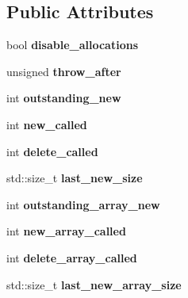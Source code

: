 \subsection*{Public Attributes}
\begin{DoxyCompactItemize}
\item 
\mbox{\label{class_mem_counter_aaf5adfc76eaac3b899bd9099183c8351}} 
bool {\bfseries disable\+\_\+allocations}
\item 
\mbox{\label{class_mem_counter_ab05dce02fc46916b2138e69fd996d3ca}} 
unsigned {\bfseries throw\+\_\+after}
\item 
\mbox{\label{class_mem_counter_a61be06c9a0af454f8da86a00cb788c5e}} 
int {\bfseries outstanding\+\_\+new}
\item 
\mbox{\label{class_mem_counter_aa1e1e8117ba92203612a5f8c2117b0dc}} 
int {\bfseries new\+\_\+called}
\item 
\mbox{\label{class_mem_counter_a2b5ade9b867050bfb97e2d25688864d1}} 
int {\bfseries delete\+\_\+called}
\item 
\mbox{\label{class_mem_counter_a06197bc7e0e7b12f87659f351751467d}} 
std\+::size\+\_\+t {\bfseries last\+\_\+new\+\_\+size}
\item 
\mbox{\label{class_mem_counter_a5248b8748e9e98e7575fa421a66389f1}} 
int {\bfseries outstanding\+\_\+array\+\_\+new}
\item 
\mbox{\label{class_mem_counter_a59b62d66b27168a22084ce59206d8e81}} 
int {\bfseries new\+\_\+array\+\_\+called}
\item 
\mbox{\label{class_mem_counter_ae5d07f6d7583848e161ddfde57f93e5b}} 
int {\bfseries delete\+\_\+array\+\_\+called}
\item 
\mbox{\label{class_mem_counter_a93774e66e20bfc52bc354c283095c101}} 
std\+::size\+\_\+t {\bfseries last\+\_\+new\+\_\+array\+\_\+size}
\end{DoxyCompactItemize}
